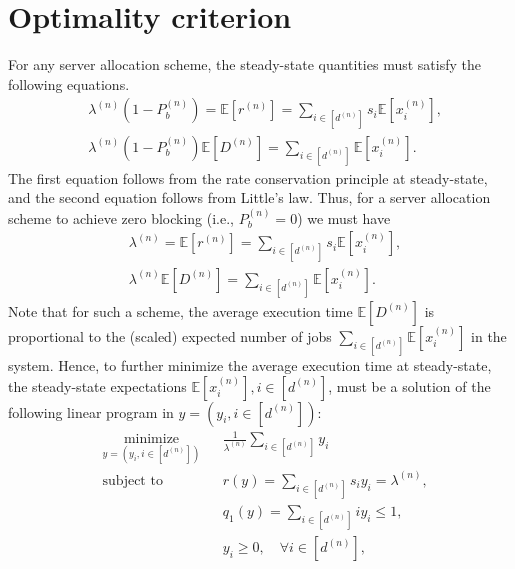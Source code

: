 \documentclass[a4paper]{article}
\theoremstyle{plain}
\theoremstyle{definition}
\theoremstyle{case}
\theoremstyle{remark}
\newcommand{\brac}[1]{\left(#1\right)}
\newcommand{\sbrac}[1]{\left[#1\right]}
\newcommand{\expect}[1]{\mathbb{E}\sbrac{#1}}
\begin{document}
\section{Optimality criterion}
\label{sec:lower}

For any server allocation scheme, the steady-state quantities must satisfy the following equations.
%
\begin{align}
    &\lambda^{(n)}\brac{1-P_b^{(n)}}=\expect{r^{(n)}}=\sum_{i\in [d^{(n)}]}s_i \expect{x_i^{(n)}},\label{eq:rate_consevation}\\
    &\lambda^{(n)}\brac{1-P_b^{(n)}}\expect{D^{(n)}}=\sum_{i\in [d^{(n)}]} \expect{x_i^{(n)}}\label{eq:little}.
\end{align}
%
The first equation follows from the rate conservation principle at steady-state, %
and the second equation follows from Little's law. %
Thus, for a server allocation scheme to achieve zero blocking (i.e., $P_b^{(n)}=0$) we must have
%
\begin{align}    &\lambda^{(n)}=\expect{r^{(n)}}=\sum_{i\in [d^{(n)}]}s_i \expect{x_i^{(n)}}\label{eq:rate_consevation_zerob},\\  &\lambda^{(n)}\expect{D^{(n)}}=\sum_{i\in [d^{(n)}]} \expect{x_i^{(n)}}\label{eq:little_zerob}.
\end{align}
%
Note that for such a scheme, the average execution time $\mathbb{E}[D^{(n)}]$ is proportional to the (scaled) expected number of jobs $\sum_{i \in [d^{(n)}]}\mathbb{E}[x_i^{(n)}]$ in the system.
Hence, to further minimize the average execution time at steady-state, the steady-state expectations $\mathbb{E}[x_i^{(n)}], i\in [d^{(n)}]$, must be a solution of the following linear program in $y=(y_i, i\in [d^{(n)}])$:
%
\begin{equation}
        \begin{aligned}
        & \underset{y=(y_i,i\in [d^{(n)}])} {\text{minimize}}
        & & \frac{1}{\lambda^{(n)}}\sum_{i \in [d^{(n)}]} y_i\\
        & \text{subject to}
        & & r(y)=\sum_{i \in [d^{(n)}]} s_i y_i = \lambda^{(n)}, \\
        & & &q_1(y)=\sum_{i\in [d^{(n)}]} i y_i \leq 1,\\
        & & &  y_i \geq 0, \quad \forall i \in [d^{(n)}],
        \end{aligned}
        \tag{P}
    \label{eq:opt}
\end{equation}
\end{document}
